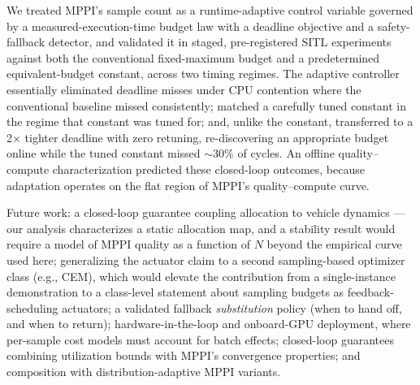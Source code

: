 \documentclass[conference]{IEEEtran}
\begin{document}
We treated MPPI's sample count as a runtime-adaptive control variable
governed by a measured-execution-time budget law with a deadline
objective and a safety-fallback detector, and validated it in staged,
pre-registered
SITL experiments against both the conventional fixed-maximum budget and a
predetermined equivalent-budget constant, across two timing regimes. The
adaptive controller essentially eliminated deadline misses under CPU
contention where the conventional baseline missed consistently; matched a
carefully tuned constant in the regime that constant was tuned for; and,
unlike the constant, transferred to a 2$\times$ tighter deadline with
zero retuning, re-discovering an appropriate budget online while the
tuned constant missed $\sim$30\% of cycles. An offline quality--compute
characterization predicted these closed-loop outcomes, because adaptation
operates on the flat region of MPPI's quality--compute curve.

Future work: a closed-loop guarantee coupling allocation to vehicle
dynamics --- our analysis characterizes a static allocation map, and a
stability result would require a model of MPPI quality as a function of
$N$ beyond the empirical curve used here; generalizing the actuator
claim to a second sampling-based optimizer class (e.g., CEM), which
would elevate the contribution from a single-instance demonstration to a
class-level statement about sampling budgets as feedback-scheduling
actuators; a validated fallback
\emph{substitution} policy (when to hand off, and when to return);
hardware-in-the-loop and onboard-GPU deployment, where per-sample cost
models must account for batch effects; closed-loop guarantees combining
utilization bounds with MPPI's convergence properties; and composition
with distribution-adaptive MPPI variants.



\end{document}
